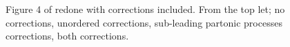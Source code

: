 \begin{figure}[t]
\caption{Figure 4 of \cite{Aad2015} redone with corrections included. From the top let; no corrections, unordered corrections, sub-leading partonic processes corrections, both corrections.}
\label{fig:4jet}
\end{figure}

